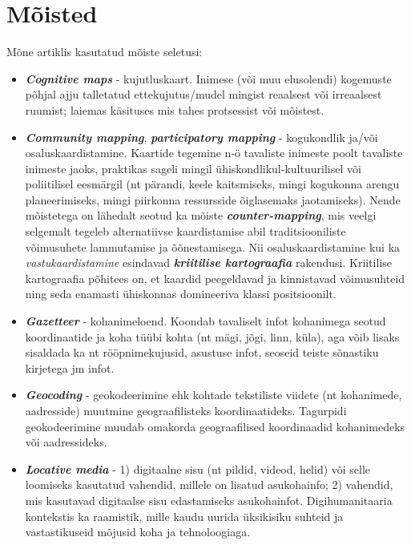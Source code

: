 \documentclass[
]{book}
\providecommand{\tightlist}{%
  \setlength{\itemsep}{0pt}\setlength{\parskip}{0pt}}
\begin{document}
\hypertarget{muxf5isted}{%
\section{Mõisted}\label{muxf5isted}}

Mõne artiklis kasutatud mõiste seletusi:

\begin{itemize}
\tightlist
\item
  \textbf{\emph{Cognitive maps}} - kujutluskaart. Inimese (või muu elusolendi) kogemuste põhjal ajju talletatud ettekujutus/mudel mingist reaalsest või irreaalsest ruumist; laiemas käsituses mis tahes protsessist või mõistest.\\
\item
  \textbf{\emph{Community mapping}}, \textbf{\emph{participatory mapping}} - kogukondlik ja/või osaluskaardistamine. Kaartide tegemine n-ö tavaliste inimeste poolt tavaliste inimeste jaoks, praktikas sageli mingil ühiskondlikul-kultuurilisel või poliitilisel eesmärgil (nt pärandi, keele kaitsmiseks, mingi kogukonna arengu planeerimiseks, mingi piirkonna ressursside õiglasemaks jaotamiseks). Nende mõistetega on lähedalt seotud ka mõiste \textbf{\emph{counter-mapping}}, mis veelgi selgemalt tegeleb alternatiivse kaardistamise abil traditsiooniliste võimusuhete lammutamise ja õõnestamisega. Nii osaluskaardistamine kui ka \emph{vastukaardistamine} esindavad \textbf{\emph{kriitilise kartograafia}} rakendusi. Kriitilise kartograafia põhitees on, et kaardid peegeldavad ja kinnistavad võimusuhteid ning seda enamasti ühiskonnas domineeriva klassi positsioonilt.\\
\item
  \textbf{\emph{Gazetteer}} - kohanimeloend. Koondab tavaliselt infot kohanimega seotud koordinaatide ja koha tüübi kohta (nt mägi, jõgi, linn, küla), aga võib lisaks sisaldada ka nt rööpnimekujusid, asustuse infot, seoseid teiste sõnastiku kirjetega jm infot.\\
\item
  \textbf{\emph{Geocoding}} - geokodeerimine ehk kohtade tekstiliste viidete (nt kohanimede, aadresside) muutmine geograafilisteks koordinaatideks. Tagurpidi geokodeerimine muudab omakorda geograafilised koordinaadid kohanimedeks või aadressideks.\\
\item
  \textbf{\emph{Locative media}} - 1) digitaalne sisu (nt pildid, videod, helid) või selle loomiseks kasutatud vahendid, millele on lisatud asukohainfo; 2) vahendid, mis kasutavad digitaalse sisu edastamiseks asukohainfot. Digihumanitaaria kontekstis ka raamistik, mille kaudu uurida üksikisiku suhteid ja vastastikuseid mõjusid koha ja tehnoloogiaga.\\

\end{itemize}
\end{document}
